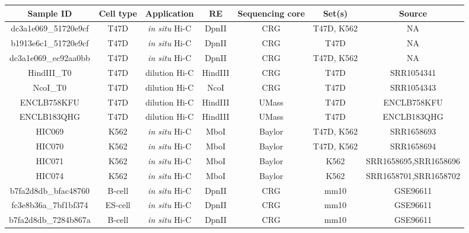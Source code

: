 \documentclass{bioinfo}
\begin{document}
\begin{methods}
\begin{table}
{\begin{tabular}{ccccccc}
  \toprule
  \textbf{Sample ID} & \textbf{Cell type} & \textbf{Application} &
  \textbf{RE} & \textbf{Sequencing core} & \textbf{Set(s)} &
  \textbf{Source} \\
  \midrule
dc3a1e069\_51720e9cf & T47D & \textit{in situ} Hi-C &
  DpnII & CRG & T47D, K562 & NA \\
b1913e6c1\_51720e9cf & T47D & \textit{in situ} Hi-C &
  DpnII & CRG & T47D & NA \\
dc3a1e069\_ec92aa0bb & T47D & \textit{in situ} Hi-C &
  DpnII & CRG & T47D, K562 & NA \\
HindIII\_T0 & T47D & dilution Hi-C &
  HindIII & CRG & T47D & SRR1054341 \\
NcoI\_T0    & T47D & dilution Hi-C &
  NcoI      & CRG & T47D & SRR1054343 \\
ENCLB758KFU & T47D & dilution Hi-C &
  HindIII   & UMass & T47D & ENCLB758KFU \\
ENCLB183QHG & T47D & dilution Hi-C &
  HindIII   & UMass & T47D & ENCLB183QHG \\
HIC069  & K562 & \textit{in situ} Hi-C &
  MboI & Baylor & T47D, K562 &    SRR1658693 \\
HIC070  & K562 & \textit{in situ} Hi-C &
  MboI & Baylor & T47D, K562 &    SRR1658694 \\
HIC071  & K562 & \textit{in situ} Hi-C &
  MboI & Baylor & K562 & SRR1658695,SRR1658696 \\
HIC074  & K562 & \textit{in situ} Hi-C &
  MboI & Baylor & K562 & SRR1658701,SRR1658702 \\
b7fa2d8db\_bfac48760 & B-cell  & \textit{in situ} Hi-C &
  DpnII & CRG & mm10 & GSE96611 \\
fc3e8b36a\_7bf1bf374 & ES-cell & \textit{in situ} Hi-C &
  DpnII & CRG & mm10 & GSE96611 \\
b7fa2d8db\_7284b867a & B-cell  & \textit{in situ} Hi-C &
  DpnII & CRG & mm10 & GSE96611 \\

\end{tabular}}
\end{table}
\end{methods}
\end{document}
